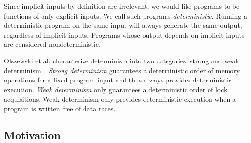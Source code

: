 Since implicit inputs by definition are irrelevant, we would like programs to be
functions of only explicit inputs. We call such programs \emph{deterministic}.
Running a deterministic program on the same input will always generate the same
output, regardless of implicit inputs. Programs whose output depends on
implicit inputs are considered nondeterministic.

Olszewski et al. characterize determinism into two categories: strong and weak
determinism~\cite{olszewski2009kendo}. \emph{Strong determinism} guarantees a
deterministic order of memory operations for a fixed program input and thus
always provides deterministic execution. \emph{Weak determinism} only guarantees
a deterministic order of lock acquisitions. Weak determinism only provides
deterministic execution when a program is written free of data races.

\iffalse
\paragraph{A New Programming Model}
\fi

\iffalse

Parallel programming languages, like DPJ~\cite{bocchino2009type}, provide
deterministic execution; however, since these languages require rewriting
existing programs and have limited potential for wide uptake, we shall not
consider such systems. We also will not consider systems that require
specialized hardware, again due to their limited availability. We would like
a deterministic environment that runs on standard computer hardware written in
popular, convention programming languages like C.

We focus on systems that run programs deterministically written in conventional
languages, like C. Kendo is a weakly deterministic runtime
library~\cite{olszewski2009kendo} for C++ applications.
CoreDet\~cite{bergan2010coredet} provides strong determinism via a compiler
and runtime library.

Even though we consider some inputs to be nondeterministic (like
{\tt gettimeofday()}), these inputs are often semantically relevant to a
program. Thus, we focus our efforts on nondeterministic implicit inputs.

Explicit inputs are what program

\fi

\subsection{Motivation}

